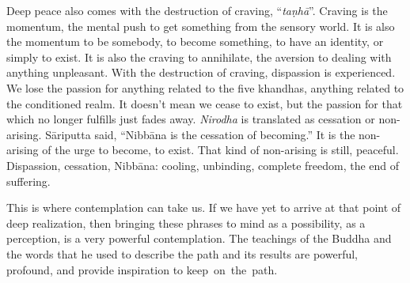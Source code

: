 Deep peace also comes with the destruction of craving, ``\emph{taṇhā}''. Craving is the momentum, the mental push to get something from the sensory world. It is also the momentum to be somebody, to become something, to have an identity, or simply to exist. It is also the craving to annihilate, the aversion to dealing with anything unpleasant. With the destruction of craving, dispassion is experienced. We lose the passion for anything related to the five khandhas, anything related to the conditioned realm. It doesn't mean we cease to exist, but the passion for that which no longer fulfills just fades away. \emph{Nirodha} is translated as cessation or non-arising. Sāriputta said, ``Nibbāna is the cessation of becoming.'' It is the non-arising of the urge to become, to exist. That kind of non-arising is still, peaceful. Dispassion, cessation, Nibbāna: cooling, unbinding, complete freedom, the end of suffering.

This is where contemplation can take us. If we have yet to arrive at that point of deep realization, then bringing these phrases to mind as a possibility, as a perception, is a very powerful contemplation. The teachings of the Buddha and the words that he used to describe the path and its results are powerful, profound, and provide inspiration to \mbox{keep on the path.}
